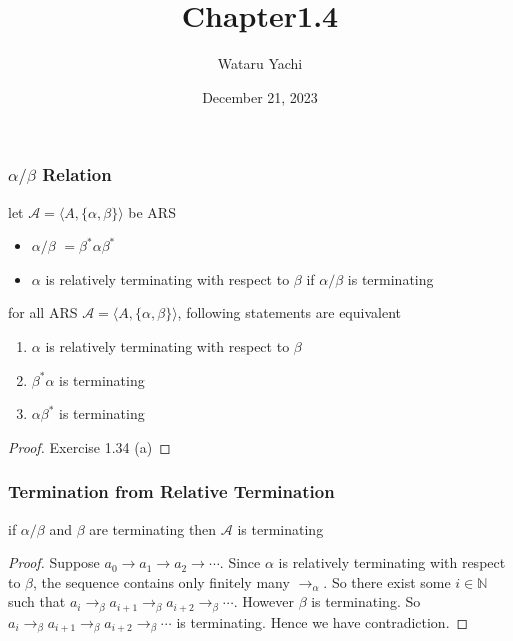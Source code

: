 \documentclass[12pt,aspectratio=169]{beamer}
\title{ Chapter1.4 }
\author{Wataru Yachi}
\institute{JAIST}
\date{December 21, 2023}
\begin{document}
\maketitle

\newcommand{\MA}{\mathcal{A}}
\newcommand{\AB}{\alpha/\beta}

\begin{frame}
    \frametitle{$\alpha/\beta$ Relation}
    \begin{definition}
        let $\MA = \langle A, \{\alpha,\beta\} \rangle$ be ARS
        \begin{itemize}
            \item \alert{$\AB$} $= \beta^*\alpha\beta^*$
            \item $\alpha$ is \alert{relatively terminating} with respect to $\beta$ if $\AB$ is terminating 
        \end{itemize}
    \end{definition}
    \begin{example}
    \end{example}
\end{frame}

\begin{frame}
\begin{lemma}
    for all ARS $\MA = \langle A, \{\alpha,\beta\} \rangle$, following statements are equivalent
    \begin{enumerate}
        \item $\alpha$ is relatively terminating with respect to $\beta$
        \item $\beta^*\alpha$ is terminating
        \item $\alpha\beta^*$ is terminating
    \end{enumerate}
\end{lemma}

\begin{proof}
    Exercise 1.34 (a) 
\end{proof}

\end{frame}
\newcommand{\bto}{\to_{\beta}}
\newcommand{\ato}{\to_{\alpha}}

\begin{frame}
    \frametitle{Termination from Relative Termination}
    \begin{lemma}
        if $\AB$ and $\beta$ are terminating then $\MA$ is terminating
    \end{lemma}
    \begin{proof}
        Suppose $a_0 \to a_1 \to a_2 \to \cdots$. Since $\alpha$ is relatively terminating
        with respect to $\beta$, the sequence contains only finitely many $\ato$.
        So there exist some $i \in \mathbb{N}$ such that
        $a_i \bto a_{i+1} \bto a_{i+2} \bto \cdots$. 
        However $\beta$ is terminating.
        So $a_i \bto a_{i+1} \bto a_{i+2} \bto \cdots$ is terminating.
        Hence we have contradiction.
    \end{proof}
\end{frame}
\end{document}
